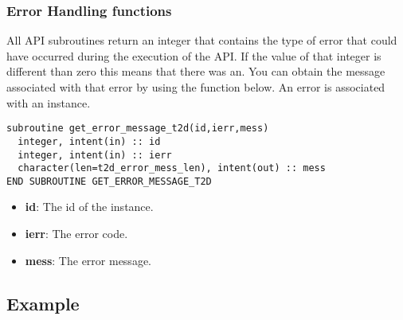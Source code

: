 \subsubsection{Error Handling functions}
All API subroutines return an integer that contains the type of error that
could have occurred during the execution of the API. If the value of that
integer is different than zero this means that there was an. You can
obtain the message associated with that error by using the function below.
An error is associated with an instance.
\begin{lstlisting}
subroutine get_error_message_t2d(id,ierr,mess) 
  integer, intent(in) :: id
  integer, intent(in) :: ierr
  character(len=t2d_error_mess_len), intent(out) :: mess
END SUBROUTINE GET_ERROR_MESSAGE_T2D
\end{lstlisting}
\begin{itemize}
\item \textbf{id}: The id of the instance.
\item \textbf{ierr}: The error code.
\item \textbf{mess}: The error message.
\end{itemize}

\subsection{Example}

